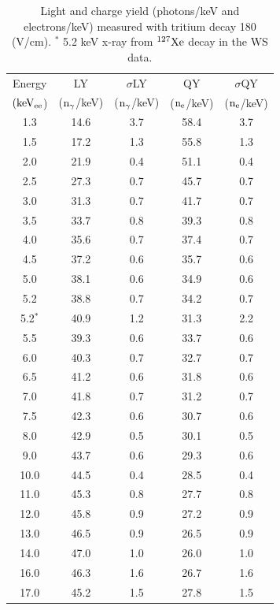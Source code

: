 \begin{table}[h!]
\centering
\begin{tabular}{|c|c|c|c|c|} \hline
Energy 	& 		LY	& 	$\sigma$LY & QY  & $\sigma$QY \\ 
$\rm (keV_{ee}$) & ($\rm n_\gamma$/keV) 	& ($\rm n_\gamma$/keV) & ($\rm n_e$/keV) & ($\rm n_e$/keV) \\ \hline
1.3 	 & 14.6 	 & 3.7 	 & 58.4 	 & 3.7 \\ \hline 
1.5 	 & 17.2 	 & 1.3 	 & 55.8 	 & 1.3 \\ \hline 
2.0 	 & 21.9 	 & 0.4 	 & 51.1 	 & 0.4 \\ \hline 
2.5 	 & 27.3 	 & 0.7 	 & 45.7 	 & 0.7 \\ \hline 
3.0 	 & 31.3 	 & 0.7 	 & 41.7 	 & 0.7 \\ \hline 
3.5 	 & 33.7 	 & 0.8 	 & 39.3 	 & 0.8 \\ \hline 
4.0 	 & 35.6 	 & 0.7 	 & 37.4 	 & 0.7 \\ \hline 
4.5 	 & 37.2 	 & 0.6 	 & 35.7 	 & 0.6 \\ \hline 
5.0 	 & 38.1 	 & 0.6 	 & 34.9 	 & 0.6 \\ \hline 
5.2 	 & 38.8 	 & 0.7 	 & 34.2 	 & 0.7 \\ \hline \hline
5.2$^*$ 	 & 40.9 	 & 1.2 	 & 31.3	 & 2.2 \\ \hline \hline
5.5 	 & 39.3 	 & 0.6 	 & 33.7 	 & 0.6 \\ \hline 
6.0 	 & 40.3 	 & 0.7 	 & 32.7 	 & 0.7 \\ \hline 
6.5 	 & 41.2 	 & 0.6 	 & 31.8 	 & 0.6 \\ \hline 
7.0 	 & 41.8 	 & 0.7 	 & 31.2 	 & 0.7 \\ \hline 
7.5 	 & 42.3 	 & 0.6 	 & 30.7 	 & 0.6 \\ \hline 
8.0 	 & 42.9 	 & 0.5 	 & 30.1 	 & 0.5 \\ \hline 
9.0 	 & 43.7 	 & 0.6 	 & 29.3 	 & 0.6 \\ \hline 
10.0 	 & 44.5 	 & 0.4 	 & 28.5 	 & 0.4 \\ \hline 
11.0 	 & 45.3 	 & 0.8 	 & 27.7 	 & 0.8 \\ \hline 
12.0 	 & 45.8 	 & 0.9 	 & 27.2 	 & 0.9 \\ \hline 
13.0 	 & 46.5 	 & 0.9 	 & 26.5 	 & 0.9 \\ \hline 
14.0 	 & 47.0 	 & 1.0 	 & 26.0 	 & 1.0 \\ \hline 
16.0 	 & 46.3 	 & 1.6 	 & 26.7 	 & 1.6 \\ \hline 
17.0 	 & 45.2 	 & 1.5 	 & 27.8 	 & 1.5 \\ \hline 
\end{tabular}
\caption{Light and charge yield (photons/keV and electrons/keV) measured with tritium decay 180 (V/cm). $^*$ 5.2 keV x-ray from $\rm ^{127}Xe$ decay in the WS data.}
\label{table:Yields}
\end{table}

